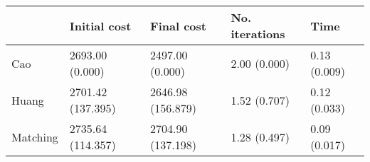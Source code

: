 \begin{tabular}{lllll}
\toprule
{} &       Initial cost &         Final cost & No. iterations &          Time \\
\midrule
Cao      &    2693.00 (0.000) &    2497.00 (0.000) &   2.00 (0.000) &  0.13 (0.009) \\
Huang    &  2701.42 (137.395) &  2646.98 (156.879) &   1.52 (0.707) &  0.12 (0.033) \\
Matching &  2735.64 (114.357) &  2704.90 (137.198) &   1.28 (0.497) &  0.09 (0.017) \\
\bottomrule
\end{tabular}
